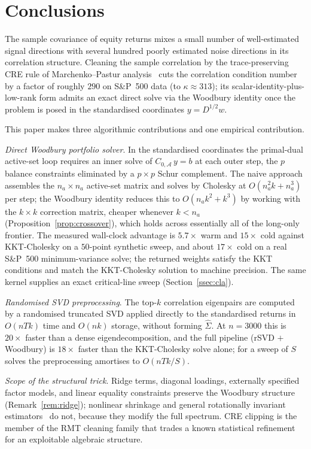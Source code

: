 \section{Conclusions}\label{sec:conclusions}

The sample covariance of equity returns mixes a small number of well-estimated
signal directions with several hundred poorly estimated noise directions in its
correlation structure. Cleaning the sample correlation by the trace-preserving CRE
rule of Marchenko--Pastur analysis~\cite{laloux1999,bun2017} cuts the correlation
condition number by a factor of roughly $290$ on S\&P~500 data (to
$\kappa \approx 313$); its scalar-identity-plus-low-rank form admits an exact
direct solve via the Woodbury identity once the problem is posed in the
standardised coordinates $y = D^{1/2}w$.

This paper makes three algorithmic contributions and one empirical contribution.

\emph{Direct Woodbury portfolio solver}. In the standardised coordinates the
primal-dual active-set loop requires an inner solve of $C_{0,\mathcal{A}}\,y = b$
at each outer step, the $p$ balance constraints eliminated by a $p \times p$ Schur
complement. The naive approach assembles the $n_a \times n_a$ active-set matrix and
solves by Cholesky at $O(n_a^2 k + n_a^3)$ per step; the Woodbury identity reduces
this to $O(n_a k^2 + k^3)$ by working with the $k \times k$ correction matrix,
cheaper whenever $k < n_a$ (Proposition~\ref{prop:crossover}), which holds across
essentially all of the long-only frontier. The measured wall-clock advantage is
$5.7\times$ warm and $15\times$ cold against KKT-Cholesky on a $50$-point synthetic
sweep, and about $17\times$ cold on a real S\&P~500 minimum-variance solve; the
returned weights satisfy the KKT conditions and match the KKT-Cholesky solution to
machine precision. The same kernel supplies an exact critical-line sweep
(Section~\ref{ssec:cla}).

\emph{Randomised SVD preprocessing}. The top-$k$ correlation eigenpairs are
computed by a randomised truncated SVD applied directly to the standardised
returns in $O(nTk)$ time and $O(nk)$ storage, without forming $\hat\Sigma$. At
$n=3000$ this is $20\times$ faster than a dense eigendecomposition, and the full
pipeline (rSVD $+$ Woodbury) is $18\times$ faster than the KKT-Cholesky solve
alone; for a sweep of $S$ solves the preprocessing amortises to $O(nTk/S)$.

\emph{Scope of the structural trick}. Ridge terms, diagonal loadings, externally
specified factor models, and linear equality constraints preserve the Woodbury
structure (Remark~\ref{rem:ridge}); nonlinear shrinkage and general rotationally
invariant estimators~\cite{ledoitpeche2011,ledoit2012,bun2017} do not, because
they modify the full spectrum. CRE clipping is the member of the RMT cleaning
family that trades a known statistical refinement for an exploitable algebraic
structure.

